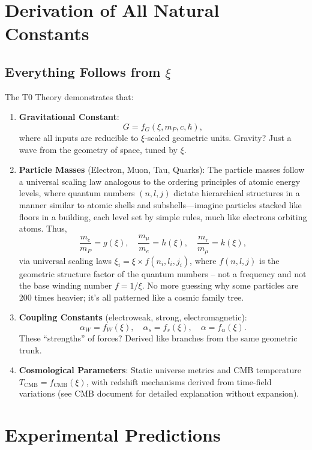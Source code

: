 	\section{Derivation of All Natural Constants}
	
	\subsection{Everything Follows from $\xi$}
	The T0 Theory demonstrates that:
	
	\begin{enumerate}
		\item \textbf{Gravitational Constant}:
		\[
		G = f_G(\xi, m_P, c, \hbar),
		\]
		where all inputs are reducible to $\xi$-scaled geometric units. Gravity? Just a wave from the geometry of space, tuned by $\xi$.
		
		\item \textbf{Particle Masses} (Electron, Muon, Tau, Quarks):
		The particle masses follow a universal scaling law analogous to the ordering principles of atomic energy levels, where quantum numbers $(n, l, j)$ dictate hierarchical structures in a manner similar to atomic shells and subshells—imagine particles stacked like floors in a building, each level set by simple rules, much like electrons orbiting atoms. Thus,
		\[
		\frac{m_e}{m_P} = g(\xi), \quad \frac{m_\mu}{m_e} = h(\xi), \quad \frac{m_\tau}{m_\mu} = k(\xi),
		\]
		via universal scaling laws $\xi_i = \xi \times f(n_i, l_i, j_i)$, where $f(n,l,j)$ is the geometric structure factor of the quantum numbers -- not a frequency and not the base winding number $f = 1/\xi$. No more guessing why some particles are 200 times heavier; it's all patterned like a cosmic family tree.
		
		\item \textbf{Coupling Constants} (electroweak, strong, electromagnetic):
		\[
		\alpha_W = f_W(\xi), \quad \alpha_s = f_s(\xi), \quad \alpha = f_\alpha(\xi).
		\]
		These ``strengths'' of forces? Derived like branches from the same geometric trunk.
		
		\item \textbf{Cosmological Parameters}:
		Static universe metrics and CMB temperature $T_{\text{CMB}} = f_{\text{CMB}}(\xi)$, with redshift mechanisms derived from time-field variations (see CMB document for detailed explanation without expansion).
	\end{enumerate}

	\section{Experimental Predictions}
	
